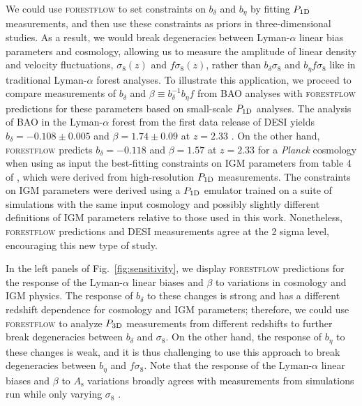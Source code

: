 \documentclass[longauth]{aa}
\newcommand{\lya}{Lyman-$\alpha$\xspace}
\newcommand{\lyaf}{Lyman-$\alpha$ forest\xspace}
\newcommand{\poned}{\ensuremath{P_{\rm 1D}}\xspace}
\newcommand{\pthreed}{\ensuremath{P_{\rm 3D}}\xspace}
\newcommand{\forestflow}{\textsc{forestflow}\xspace}
\begin{document}
We could use \forestflow to set constraints on $b_\delta$ and $b_\eta$ by fitting \poned measurements, and then use these constraints as priors in three-dimensional studies. As a result, we would break degeneracies between \lya linear bias parameters and cosmology, allowing us to measure the amplitude of linear density and velocity fluctuations, $\sigma_8(z)$ and $f \sigma_8(z)$, rather than $b_\delta \sigma_8$ and $b_\eta f \sigma_8$ like in traditional \lyaf analyses. To illustrate this application, we proceed to compare measurements of $b_\delta$ and $\beta\equiv b_\delta^{-1} b_\eta f$ from BAO analyses with \forestflow predictions for these parameters based on small-scale \poned analyses. The analysis of BAO in the \lyaf from the first data release of DESI yields $b_\delta=-0.108\pm0.005$ and $\beta=1.74\pm0.09$ at $z=2.33$ \citep{desicollaboration2024DESI2024IV}. On the other hand, \forestflow predicts $b_\delta=-0.118$ and $\beta=1.57$ at $z=2.33$ for a {\it Planck} cosmology when using as input the best-fitting constraints on IGM parameters from table 4 of \citet{emugp_Walther2019}, which were derived from high-resolution \poned measurements. The constraints on IGM parameters were derived using a \poned emulator trained on a suite of simulations with the same input cosmology and possibly slightly different definitions of IGM parameters relative to those used in this work. Nonetheless, \forestflow predictions and DESI measurements agree at the 2 sigma level, encouraging this new type of study.

In the left panels of Fig.~\ref{fig:sensitivity}, we display \forestflow predictions for the response of the \lya linear biases and $\beta$ to variations in cosmology and IGM physics. The response of $b_\delta$ to these changes is strong and has a different redshift dependence for cosmology and IGM parameters; therefore, we could use \forestflow to analyze \pthreed measurements from different redshifts to further break degeneracies between $b_\delta$ and $\sigma_8$. On the other hand, the response of $b_\eta$ to these changes is weak, and it is thus challenging to use this approach to break degeneracies between $b_\eta$ and $f \sigma_8$. Note that the response of the \lya linear biases and $\beta$ to $A_\mathrm{s}$ variations broadly agrees with measurements from simulations run while only varying $\sigma_8$ \citep{arinyo-i-prats2015NonlinearPowerSpectrum}.
\end{document}
